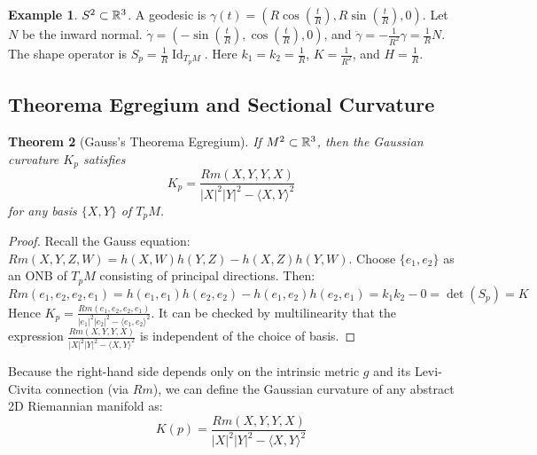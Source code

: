 \documentclass[11pt, a4paper]{article}
\theoremstyle{plain}
\newtheorem{theorem}{Theorem}[section]
\theoremstyle{definition}
\newtheorem{example}[theorem]{Example}
\theoremstyle{remark}
\DeclareMathOperator{\Id}{Id}
\begin{document}
{\begin{example}
$S^2 \subset \mathbb{R}^3$. A geodesic is $\gamma(t) = (R \cos(\frac{t}{R}), R \sin(\frac{t}{R}), 0)$.
Let $N$ be the inward normal. 
$\dot{\gamma} = (-\sin(\frac{t}{R}), \cos(\frac{t}{R}), 0)$, and $\ddot{\gamma} = -\frac{1}{R^2} \gamma = \frac{1}{R} N$.
The shape operator is $S_p = \frac{1}{R} \Id_{T_p M}$. Here $k_1 = k_2 = \frac{1}{R}$, $K = \frac{1}{R^2}$, and $H = \frac{1}{R}$.
\end{example}

\subsection{Theorema Egregium and Sectional Curvature}

\begin{theorem}[Gauss's Theorema Egregium]
If $M^2 \subset \mathbb{R}^3$, then the Gaussian curvature $K_p$ satisfies
\[ K_p = \frac{Rm(X,Y,Y,X)}{|X|^2|Y|^2 - \langle X,Y \rangle^2} \]
for any basis $\{X, Y\}$ of $T_pM$.
\end{theorem}
\begin{proof}
Recall the Gauss equation: $Rm(X,Y,Z,W) = h(X,W)h(Y,Z) - h(X,Z)h(Y,W)$.
Choose $\{e_1, e_2\}$ as an ONB of $T_pM$ consisting of principal directions. Then:
\[ Rm(e_1, e_2, e_2, e_1) = h(e_1, e_1)h(e_2, e_2) - h(e_1, e_2)h(e_2, e_1) = k_1 k_2 - 0 = \det(S_p) = K \]
Hence $K_p = \frac{Rm(e_1, e_2, e_2, e_1)}{|e_1|^2|e_2|^2 - \langle e_1, e_2 \rangle^2}$. It can be checked by multilinearity that the expression $\frac{Rm(X,Y,Y,X)}{|X|^2|Y|^2 - \langle X,Y \rangle^2}$ is independent of the choice of basis.
\end{proof}

Because the right-hand side depends only on the intrinsic metric $g$ and its Levi-Civita connection (via $Rm$), we can define the Gaussian curvature of any abstract 2D Riemannian manifold as:
\[ K(p) = \frac{Rm(X,Y,Y,X)}{|X|^2|Y|^2 - \langle X,Y \rangle^2} \]

}
\end{document}
